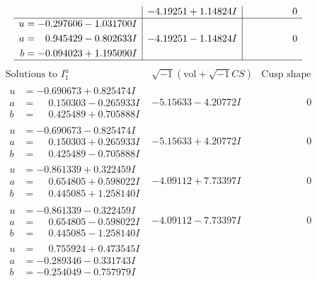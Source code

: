 \documentclass[1p]{elsarticle_modified}
\theoremstyle{definition}
\newcommand{\I}{\sqrt{-1}}
\begin{document}
$$\begin{array}{c|c|c}
 & -4.19251 + 1.14824 I & \phantom{-0.000000 } 0 \\ \hline\begin{aligned}
u &= -0.297606 - 1.031700 I \\
a &= \phantom{-}0.945429 - 0.802633 I \\
b &= -0.094023 + 1.195090 I\end{aligned}
 & -4.19251 - 1.14824 I & \phantom{-0.000000 } 0\\
 \hline 
 \end{array}$$\newpage$$\begin{array}{c|c|c}  
\text{Solutions to }I^u_{1}& \I (\text{vol} + \sqrt{-1}CS) & \text{Cusp shape}\\
 \hline 
\begin{aligned}
u &= -0.690673 + 0.825474 I \\
a &= \phantom{-}0.150303 - 0.265933 I \\
b &= \phantom{-}0.425489 + 0.705888 I\end{aligned}
 & -5.15633 - 4.20772 I & \phantom{-0.000000 } 0 \\ \hline\begin{aligned}
u &= -0.690673 - 0.825474 I \\
a &= \phantom{-}0.150303 + 0.265933 I \\
b &= \phantom{-}0.425489 - 0.705888 I\end{aligned}
 & -5.15633 + 4.20772 I & \phantom{-0.000000 } 0 \\ \hline\begin{aligned}
u &= -0.861339 + 0.322459 I \\
a &= \phantom{-}0.654805 + 0.598022 I \\
b &= \phantom{-}0.445085 + 1.258140 I\end{aligned}
 & -4.09112 + 7.73397 I & \phantom{-0.000000 } 0 \\ \hline\begin{aligned}
u &= -0.861339 - 0.322459 I \\
a &= \phantom{-}0.654805 - 0.598022 I \\
b &= \phantom{-}0.445085 - 1.258140 I\end{aligned}
 & -4.09112 - 7.73397 I & \phantom{-0.000000 } 0 \\ \hline\begin{aligned}
u &= \phantom{-}0.755924 + 0.473545 I \\
a &= -0.289346 - 0.331743 I \\
b &= -0.254049 - 0.757979 I\end{aligned}

\end{array}$$
\end{document}
